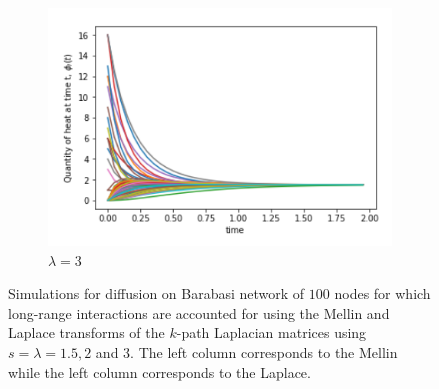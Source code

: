 \documentclass[10pt,a4paper]{article}
\theoremstyle{plain}
\theoremstyle{definition}
\begin{document}
\begin{figure}[H]
\begin{subfigure}[b]{0.45\textwidth}
        		\includegraphics[width= \textwidth]{images/Barabasi-Laplace3.png}
        		\caption{$\lambda=3$}
        	\end{subfigure}
        	\caption{Simulations for diffusion on Barabasi  network of $100$ nodes for which long-range interactions are accounted for using the Mellin and Laplace transforms of the $k$-path Laplacian matrices using $s=\lambda=1.5,2$ and $3$. The left column corresponds to the Mellin while the left column corresponds to the Laplace.}
        	\label{barabasi-Mellin-Laplace}
        \end{figure}
         
\end{document}
